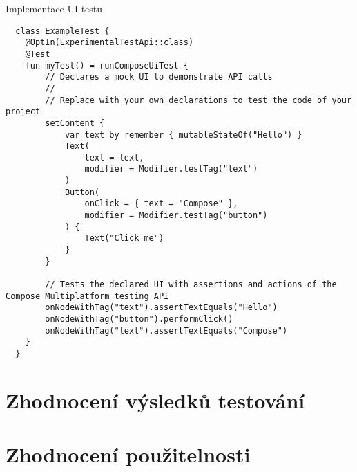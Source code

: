 
\begin{listing}[H]
  \caption{Implementace UI testu}\label{lst:testImplementation}
  \begin{verbatim}
  class ExampleTest {
    @OptIn(ExperimentalTestApi::class)
    @Test
    fun myTest() = runComposeUiTest {
        // Declares a mock UI to demonstrate API calls
        //
        // Replace with your own declarations to test the code of your project
        setContent {
            var text by remember { mutableStateOf("Hello") }
            Text(
                text = text,
                modifier = Modifier.testTag("text")
            )
            Button(
                onClick = { text = "Compose" },
                modifier = Modifier.testTag("button")
            ) {
                Text("Click me")
            }
        }
  
        // Tests the declared UI with assertions and actions of the Compose Multiplatform testing API
        onNodeWithTag("text").assertTextEquals("Hello")
        onNodeWithTag("button").performClick()
        onNodeWithTag("text").assertTextEquals("Compose")
    }
  }
\end{verbatim}
\end{listing}



\section{Zhodnocení výsledků testování}

\section{Zhodnocení použitelnosti}

